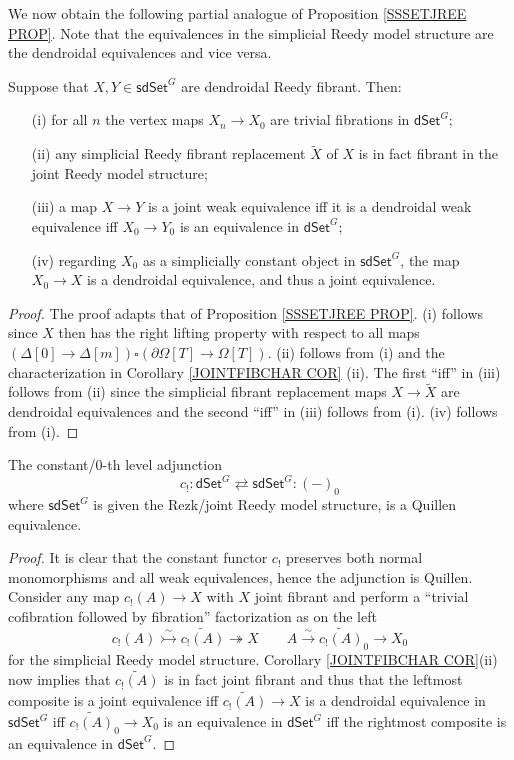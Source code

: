\documentclass[a4paper,10pt
,draft
]{article}%
\begin{document}
We now obtain the following partial analogue of Proposition \ref{SSSETJREE PROP}. Note that the equivalences in the simplicial Reedy model structure are the dendroidal equivalences and vice versa.


\begin{corollary}\label{SDSETG COR}
	Suppose that $X, Y \in \mathsf{sdSet}^G$ are dendroidal Reedy fibrant. Then:
\begin{itemize}
	\item[(i)] for all $n$ the vertex maps $X_{n} \to X_{0}$ are trivial fibrations in $\mathsf{dSet}^G$;
	\item[(ii)] any simplicial Reedy fibrant replacement $\tilde{X}$ of $X$ is in fact fibrant in the joint Reedy model structure;
	\item[(iii)] a map $X \to Y$ is a joint weak equivalence
	iff it is a dendroidal weak equivalence iff 
	$X_0 \to Y_0$ is an equivalence in $\mathsf{dSet}^G$;
	\item[(iv)] regarding $X_0$ as a simplicially constant object in $\mathsf{sdSet}^G$, the map $X_0 \to X$ is a dendroidal equivalence, and thus a joint equivalence. 
\end{itemize}
\end{corollary}

\begin{proof}
	The proof adapts that of Proposition \ref{SSSETJREE PROP}.
	(i) follows since $X$ then has the right lifting property with respect to all maps 
	$(\Delta[0] \to \Delta[m]) \square (\partial \Omega[T] \to \Omega[T])$. (ii) follows from (i) and the characterization in  Corollary \ref{JOINTFIBCHAR COR} (ii). The first ``iff'' in (iii) follows from (ii) since the simplicial fibrant replacement maps 
	$X \to \tilde{X}$ are dendroidal equivalences
	and the second ``iff'' in (iii) follows from (i).
	(iv) follows from (i).
\end{proof}

\begin{theorem}\label{INC0AGJ THM}
	The constant/$0$-th level adjunction
	\[
	c_!\colon 
	\mathsf{dSet}^G \rightleftarrows \mathsf{sdSet}^G
	\colon (-)_0
	\]
	where $\mathsf{sdSet}^G$ is given the Rezk/joint Reedy model structure,
	is a Quillen equivalence.
\end{theorem}

\begin{proof}
	It is clear that the constant functor $c_!$ preserves both normal monomorphisms and all weak equivalences, hence the adjunction is Quillen. 
	Consider any map $c_!(A) \to X$ with $X$ joint fibrant and perform a ``trivial cofibration followed by fibration'' factorization as on the left
\[
c_!(A) \overset{\sim}{\rightarrowtail} \widetilde{c_!(A)} \twoheadrightarrow X
	\qquad
A \xrightarrow{\sim} \widetilde{c_!(A)}_0 \to X_0
\]
	for the simplicial Reedy model structure. 
	Corollary \ref{JOINTFIBCHAR COR}(ii) now implies that 
	$\widetilde{c_!(A)}$ is in fact joint fibrant
	and thus that the leftmost composite is a joint equivalence iff $\widetilde{c_!(A)} \to X$ is a dendroidal equivalence in $\mathsf{sdSet}^G$ iff $\widetilde{c_!(A)}_0 \to X_0$ is an equivalence in  $\mathsf{dSet}^G$ iff the rightmost composite is an equivalence in $\mathsf{dSet}^G$.
\end{proof}
\end{document}
